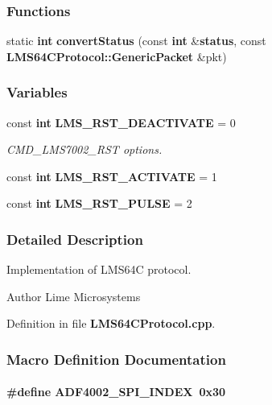 \subsubsection*{Functions}
\begin{DoxyCompactItemize}
\item 
static {\bf int} {\bf convert\+Status} (const {\bf int} \&{\bf status}, const {\bf L\+M\+S64\+C\+Protocol\+::\+Generic\+Packet} \&pkt)
\end{DoxyCompactItemize}
\subsubsection*{Variables}
\begin{DoxyCompactItemize}
\item 
const {\bf int} {\bf L\+M\+S\+\_\+\+R\+S\+T\+\_\+\+D\+E\+A\+C\+T\+I\+V\+A\+TE} = 0
\begin{DoxyCompactList}\small\item\em C\+M\+D\+\_\+\+L\+M\+S7002\+\_\+\+R\+ST options. \end{DoxyCompactList}\item 
const {\bf int} {\bf L\+M\+S\+\_\+\+R\+S\+T\+\_\+\+A\+C\+T\+I\+V\+A\+TE} = 1
\item 
const {\bf int} {\bf L\+M\+S\+\_\+\+R\+S\+T\+\_\+\+P\+U\+L\+SE} = 2
\end{DoxyCompactItemize}


\subsubsection{Detailed Description}
Implementation of L\+M\+S64C protocol. 

\begin{DoxyAuthor}{Author}
Lime Microsystems 
\end{DoxyAuthor}


Definition in file {\bf L\+M\+S64\+C\+Protocol.\+cpp}.



\subsubsection{Macro Definition Documentation}
\paragraph[{A\+D\+F4002\+\_\+\+S\+P\+I\+\_\+\+I\+N\+D\+EX}]{\setlength{\rightskip}{0pt plus 5cm}\#define A\+D\+F4002\+\_\+\+S\+P\+I\+\_\+\+I\+N\+D\+EX~0x30}\label{LMS64CProtocol_8cpp_a195e5c4ce3c72d61fa8c5a6383003e3f}



